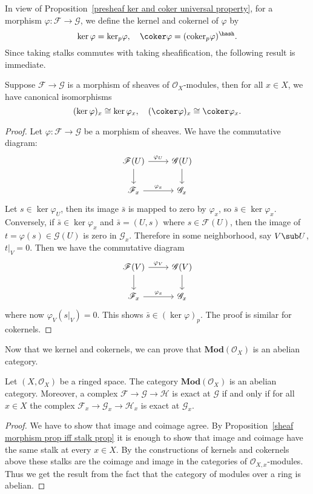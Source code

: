 In view of Proposition~\ref{presheaf ker and coker universal property}, for a morphism $\varphi:\mathscr{F}\to\mathscr{G}$, we define the kernel and cokernel of $\varphi$ by
\[\ker\varphi=\mathrm{ker}_p\varphi,\quad \coker\varphi=(\mathrm{coker}_p\varphi)^{\hash}.\]
Since taking stalks commutes with taking sheafification, the following result is immediate.
\begin{proposition}\label{sheaf ker coker and stalk prop}
Suppose $\mathscr{F}\to\mathscr{G}$ is a morphism of sheaves of $\mathscr{O}_X$-modules, then for all $x\in X$, we have canonical isomorphisms
\[(\ker\varphi)_x\cong\ker\varphi_x,\quad(\coker\varphi)_x\cong\coker\varphi_x.\]
\end{proposition}
\begin{proof}
Let $\varphi:\mathscr{F}\to\mathscr{G}$ be a morphism of sheaves. We have the commutative diagram:
\[\begin{tikzcd}
\mathscr{F}(U)\ar[r,"\varphi_U"]\ar[d]&\mathscr{G}(U)\ar[d]\\
\mathscr{F}_x\ar[r,"\varphi_x"]&\mathscr{G}_x
\end{tikzcd}\]
Let $s\in\ker\varphi_U$, then its image $\bar{s}$ is mapped to zero by $\varphi_x$, so $\bar{s}\in\ker\varphi_x$. Conversely, if $\bar{s}\in\ker\varphi_x$ and $\bar{s}=(U,s)$ where $s\in\mathscr{F}(U)$, then the image of $t=\varphi(s)\in\mathscr{G}(U)$ is zero in $\mathscr{G}_x$. Therefore in some neighborhood, say $V\sub U$, $t|_V=0$. Then we have the commutative diagram
\[\begin{tikzcd}
\mathscr{F}(V)\ar[r,"\varphi_V"]\ar[d]&\mathscr{G}(V)\ar[d]\\
\mathscr{F}_x\ar[r,"\varphi_x"]&\mathscr{G}_x
\end{tikzcd}\]
where now $\varphi_V(s|_V)=0$. This shows $\bar{s}\in(\ker\varphi)_p$. The proof is similar for cokernels.
\end{proof}
Now that we kernel and cokernels, we can prove that $\mathbf{Mod}(\mathscr{O}_X)$ is an abelian category.
\begin{theorem}\label{sheaf of module abelian cat exactness char}
Let $(X,\mathscr{O}_X)$ be a ringed space. The category $\mathbf{Mod}(\mathscr{O}_X)$ is an abelian category. Moreover, a complex $\mathscr{F}\to\mathscr{G}\to\mathscr{H}$ is exact at $\mathscr{G}$ if and only if for all $x\in X$ the complex $\mathscr{F}_x\to\mathscr{G}_x\to\mathscr{H}_x$ is exact at $\mathscr{G}_x$.
\end{theorem}
\begin{proof}
We have to show that image and coimage agree. By Proposition~\ref{sheaf morphism prop iff stalk prop} it is enough to show that image and coimage have the same stalk at every $x\in X$. By the constructions of kernels and cokernels above these stalks are the coimage and image in the categories of $\mathscr{O}_{X,x}$-modules. Thus we get the result from the fact that the category of modules over a ring is abelian.
\end{proof}
